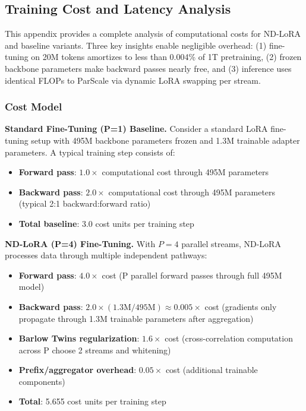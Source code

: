\documentclass{article} %
\begin{document}
\subsection{Training Cost and Latency Analysis}
\label{sec:cost_analysis}

This appendix provides a complete analysis of computational costs for ND-LoRA and baseline variants. Three key
insights enable negligible overhead: (1) fine-tuning on 20M tokens amortizes to less than 0.004\% of 1T pretraining,
(2) frozen backbone parameters make backward passes nearly free, and (3) inference uses identical FLOPs to
ParScale via dynamic LoRA swapping per stream.

\subsubsection{Cost Model}

\noindent\textbf{Standard Fine-Tuning (P=1) Baseline.}
Consider a standard LoRA fine-tuning setup with 495M backbone parameters frozen and 1.3M trainable adapter
parameters. A typical training step consists of:
\begin{itemize}
  \item \textbf{Forward pass}: $1.0\times$ computational cost through 495M parameters
  \item \textbf{Backward pass}: $2.0\times$ computational cost through 495M parameters (typical 2:1
    backward:forward ratio)
  \item \textbf{Total baseline}: 3.0 cost units per training step
\end{itemize}

\noindent\textbf{ND-LoRA (P=4) Fine-Tuning.}
With $P=4$ parallel streams, ND-LoRA processes data through multiple independent pathways:
\begin{itemize}
  \item \textbf{Forward pass}: $4.0\times$ cost (P parallel forward passes through full 495M model)
  \item \textbf{Backward pass}: $2.0 \times (1.3\text{M} / 495\text{M}) \approx 0.005\times$ cost (gradients only
    propagate through 1.3M trainable parameters after aggregation)
  \item \textbf{Barlow Twins regularization}: $1.6\times$ cost (cross-correlation computation across P choose
    2 streams and whitening)
  \item \textbf{Prefix/aggregator overhead}: $0.05\times$ cost (additional trainable components)
  \item \textbf{Total}: 5.655 cost units per training step
\end{itemize}
\end{document}
